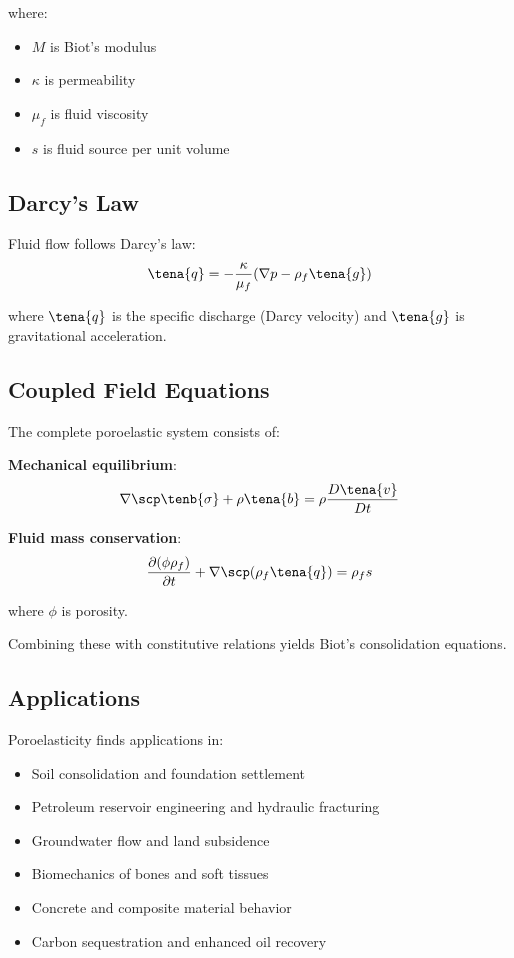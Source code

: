 where:
\begin{itemize}
\item $M$ is Biot's modulus
\item $\kappa$ is permeability
\item $\mu_f$ is fluid viscosity  
\item $s$ is fluid source per unit volume
\end{itemize}

\subsection{Darcy's Law}

Fluid flow follows Darcy's law:
\begin{equation}
\tena{q} = -\frac{\kappa}{\mu_f}(\nabla p - \rho_f \tena{g})
\end{equation}

where $\tena{q}$ is the specific discharge (Darcy velocity) and $\tena{g}$ is gravitational acceleration.

\subsection{Coupled Field Equations}

The complete poroelastic system consists of:

\textbf{Mechanical equilibrium}:
\begin{equation}
\nabla \scp \tenb{\sigma} + \rho \tena{b} = \rho \frac{D\tena{v}}{Dt}
\end{equation}

\textbf{Fluid mass conservation}:
\begin{equation}
\frac{\partial (\phi \rho_f)}{\partial t} + \nabla \scp (\rho_f \tena{q}) = \rho_f s
\end{equation}

where $\phi$ is porosity.

Combining these with constitutive relations yields Biot's consolidation equations.

\subsection{Applications}

Poroelasticity finds applications in:
\begin{itemize}
\item Soil consolidation and foundation settlement
\item Petroleum reservoir engineering and hydraulic fracturing
\item Groundwater flow and land subsidence
\item Biomechanics of bones and soft tissues
\item Concrete and composite material behavior
\item Carbon sequestration and enhanced oil recovery
\end{itemize}

